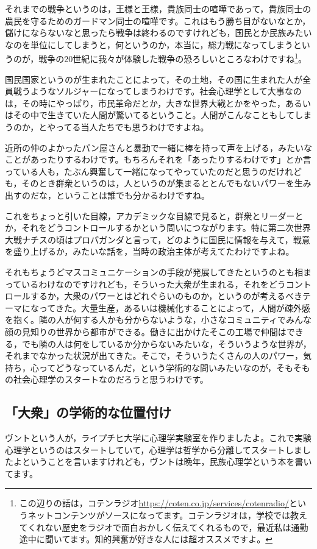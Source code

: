 \documentclass{ltjsbook}
\begin{document}
それまでの戦争というのは，王様と王様，貴族同士の喧嘩であって，貴族同士の農民を守るためのガードマン同士の喧嘩です。これはもう勝ち目がないなとか，儲けにならないなと思ったら戦争は終わるのですけれども，国民とか民族みたいなのを単位にしてしまうと，何というのか，本当に，総力戦になってしまうというのが，戦争の20世紀に我々が体験した戦争の恐ろしいところなわけですね\footnote{この辺りの話は，コテンラジオ\url{https://coten.co.jp/services/cotenradio/}というネットコンテンツがソースになってます。コテンラジオは，学校では教えてくれない歴史をラジオで面白おかしく伝えてくれるもので，最近私は通勤途中に聞いてます。知的興奮が好きな人には超オススメですよ。}。

国民国家というのが生まれたことによって，その土地，その国に生まれた人が全員戦うようなソルジャーになってしまうわけです。社会心理学として大事なのは，その時にやっぱり，市民革命だとか，大きな世界大戦とかをやった，あるいはその中で生きていた人間が驚いてるということ。人間がこんなこともしてしまうのか，とやってる当人たちでも思うわけですよね。

近所の仲のよかったパン屋さんと暴動で一緒に棒を持って声を上げる，みたいなことがあったりするわけです。もちろんそれを「あったりするわけです」とか言っている人も，たぶん興奮して一緒になってやっていたのだと思うのだけれども，そのとき群衆というのは，人というのが集まるととんでもないパワーを生み出すのだな，ということは誰でも分かるわけですね。

これをちょっと引いた目線，アカデミックな目線で見ると，群衆とリーダーとか，それをどうコントロールするかという問いにつながります。特に第二次世界大戦ナチスの頃はプロパガンダと言って，どのように国民に情報を与えて，戦意を盛り上げるか，みたいな話を，当時の政治主体が考えてたわけですよね。

それもちょうどマスコミュニケーションの手段が発展してきたというのとも相まっているわけなのですけれども，そういった大衆が生まれる，それをどうコントロールするか，大衆のパワーとはどれぐらいのものか，というのが考えるべきテーマになってきた。大量生産，あるいは機械化することによって，人間が疎外感を抱く。隣の人が何する人かも分からないような，小さなコミュニティでみんな顔の見知りの世界から都市ができる。働きに出かけたそこの工場で仲間はできる，でも隣の人は何をしているか分からないみたいな，そういうような世界が，それまでなかった状況が出てきた。そこで，そういうたくさんの人のパワー，気持ち，心ってどうなっているんだ，という学術的な問いみたいなのが，そもそもの社会心理学のスタートなのだろうと思うわけです。

\subsection{「大衆」の学術的な位置付け}
ヴントという人が，ライプチヒ大学に心理学実験室を作りましたよ。これで実験心理学というのはスタートしていて，心理学は哲学から分離してスタートしましたよということを言いますけれども，ヴントは晩年，民族心理学という本を書いてます。
\end{document}
